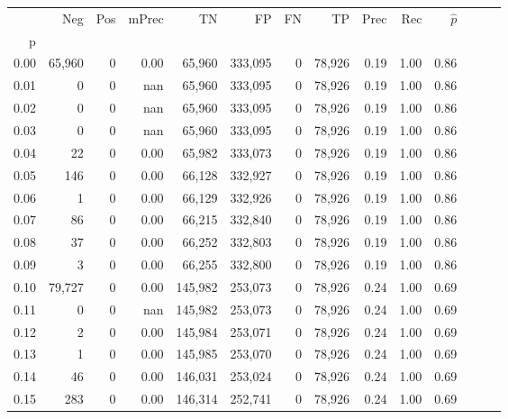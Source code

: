 \begin{tabular}{rrrrrrrrrrrrrr}
\toprule
{} &     Neg &     Pos & mPrec &       TN &       FP &      FN &      TP &  Prec &   Rec & $\hat{p}$ \\
p    &         &         &       &          &          &         &         &       &       &           \\
\midrule
0.00 &  65,960 &       0 &  0.00 &   65,960 &  333,095 &       0 &  78,926 &  0.19 &  1.00 &      0.86 \\
0.01 &       0 &       0 &   nan &   65,960 &  333,095 &       0 &  78,926 &  0.19 &  1.00 &      0.86 \\
0.02 &       0 &       0 &   nan &   65,960 &  333,095 &       0 &  78,926 &  0.19 &  1.00 &      0.86 \\
0.03 &       0 &       0 &   nan &   65,960 &  333,095 &       0 &  78,926 &  0.19 &  1.00 &      0.86 \\
0.04 &      22 &       0 &  0.00 &   65,982 &  333,073 &       0 &  78,926 &  0.19 &  1.00 &      0.86 \\
0.05 &     146 &       0 &  0.00 &   66,128 &  332,927 &       0 &  78,926 &  0.19 &  1.00 &      0.86 \\
0.06 &       1 &       0 &  0.00 &   66,129 &  332,926 &       0 &  78,926 &  0.19 &  1.00 &      0.86 \\
0.07 &      86 &       0 &  0.00 &   66,215 &  332,840 &       0 &  78,926 &  0.19 &  1.00 &      0.86 \\
0.08 &      37 &       0 &  0.00 &   66,252 &  332,803 &       0 &  78,926 &  0.19 &  1.00 &      0.86 \\
0.09 &       3 &       0 &  0.00 &   66,255 &  332,800 &       0 &  78,926 &  0.19 &  1.00 &      0.86 \\
0.10 &  79,727 &       0 &  0.00 &  145,982 &  253,073 &       0 &  78,926 &  0.24 &  1.00 &      0.69 \\
0.11 &       0 &       0 &   nan &  145,982 &  253,073 &       0 &  78,926 &  0.24 &  1.00 &      0.69 \\
0.12 &       2 &       0 &  0.00 &  145,984 &  253,071 &       0 &  78,926 &  0.24 &  1.00 &      0.69 \\
0.13 &       1 &       0 &  0.00 &  145,985 &  253,070 &       0 &  78,926 &  0.24 &  1.00 &      0.69 \\
0.14 &      46 &       0 &  0.00 &  146,031 &  253,024 &       0 &  78,926 &  0.24 &  1.00 &      0.69 \\
0.15 &     283 &       0 &  0.00 &  146,314 &  252,741 &       0 &  78,926 &  0.24 &  1.00 &      0.69 \\

\end{tabular}
